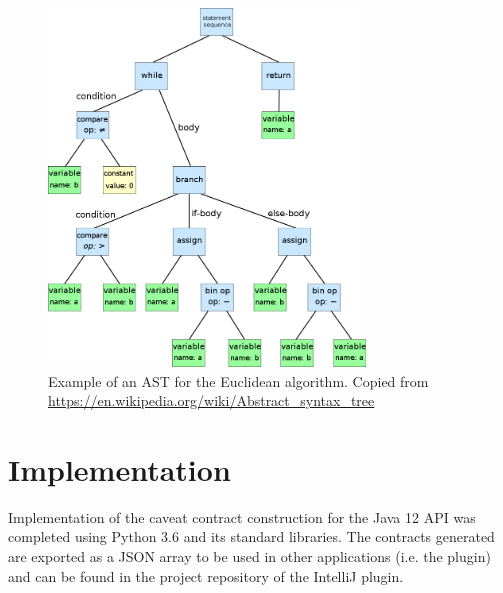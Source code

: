 \clearpage
\begin{figure}
	\label{fig:ast}
	\centering
	\includegraphics[width=0.75\textwidth]{figs/ast.png}
	\caption{Example of an AST for the Euclidean algorithm. Copied from \url{https://en.wikipedia.org/wiki/Abstract\_syntax\_tree}}
\end{figure}


\section{Implementation}
\label{sec:contract-implement}
Implementation of the caveat contract construction for the Java 12 API was completed using Python 3.6 and its standard libraries. The contracts generated are exported as a JSON array to be used in other applications (i.e. the plugin) and can be found in the project repository of the IntelliJ plugin.

